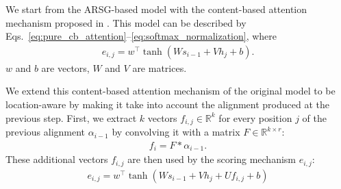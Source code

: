 \documentclass{article} %
\begin{document}
We start from the ARSG-based model with the content-based attention mechanism
proposed in \cite{bahdanau_neural_2014}. This model can be described by
Eqs.~\eqref{eq:pure_cb_attention}--\eqref{eq:softmax_normalization}, where 
\begin{align}
e_{i,j} = w^\top \tanh(W s_{i-1} + V h_j + b).
\label{eq:base_attention}
\end{align}
$w$ and $b$ are vectors, $W$ and $V$ are matrices. 



We extend this content-based attention mechanism of the original model to be
location-aware by making it take into account the alignment produced at the
previous step. First, we extract $k$ vectors $f_{i,j} \in \mathbb{R}^{k}$ for
every position $j$ of the previous alignment $\alpha_{i-1}$  by convolving it
with a matrix $F \in \mathbb{R}^{k \times r}$:
\begin{align}
    \label{eq:conv_feats}
    f_i = F * \alpha_{i-1}.
\end{align}
These additional vectors $f_{i,j}$ are then used by the scoring mechanism $e_{i,j}$:
\begin{align}
    \label{eq:hybrid_score}
    e_{i,j} = w^\top \tanh(W s_{i-1} + V h_j + U f_{i,j} + b)
\end{align}
\end{document}
